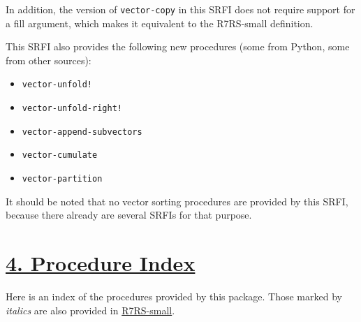 In addition, the version of \texttt{vector-copy} in this SRFI does not
require support for a fill argument, which makes it equivalent to the
R7RS-small definition.

This SRFI also provides the following new procedures (some from Python,
some from other sources):

\begin{itemize}
\tightlist
\item
  \texttt{vector-unfold!}
\item
  \texttt{vector-unfold-right!}
\item
  \texttt{vector-append-subvectors}
\item
  \texttt{vector-cumulate}
\item
  \texttt{vector-partition}
\end{itemize}

It should be noted that no vector sorting procedures are provided by
this SRFI, because there already are several SRFIs for that purpose.

\section{\texorpdfstring{\href{}{4. Procedure
Index}}{4. Procedure Index}}\label{procedure-index}

Here is an index of the procedures provided by this package. Those
marked by \emph{italics} are also provided in
\protect\hyperlink{R7RS-small}{R7RS-small}.

